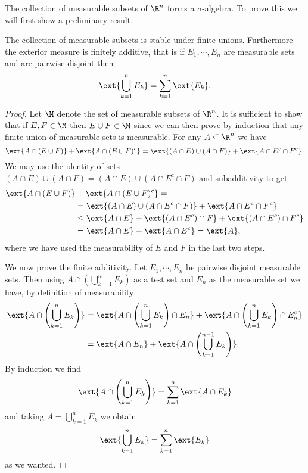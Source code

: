 \documentclass[12pt,oneside]{book}
\begin{document}
The collection of measurable subsets of \( \R^n \) forms a \( \sigma \)-algebra. To prove this we will first show a preliminary result. 
\begin{proposition}
	The collection of measurable subsets is stable under finite unions. Furthermore the exterior measure is finitely additive, that is if \( E_1, \cdots, E_n \) are measurable sets and are pairwise disjoint then 
	\begin{equation*}
		\ext{\bigcup_{k = 1}^n E_k} = \sum_{k = 1}^{n} \ext{E_k}. 
	\end{equation*}
\end{proposition}
\begin{proof}
	Let \( \M \) denote the set of measurable subsets of \( \R^n \). It is sufficient to show that if \( E, F \in \M \) then \(  E \cup F \in \M \) since we can then prove by induction that any finite union of measurable sets is measurable. For any \( A \subseteq \R^n \) we have
	\begin{equation*}
		\ext{A \cap (E \cup F)} + \ext{A \cap (E \cup F)^c} = \ext{(A \cap E) \cup (A \cap F)} + \ext{A \cap E^c \cap F^c}.
	\end{equation*}
	We may use the identity of sets \( (A \cap E) \cup (A \cap F) = (A \cap E) \cup (A \cap E^c \cap F) \) and subadditivity to get
	\begin{align*}
		\ext{A \cap (E \cup F)} & + \ext{A \cap (E \cup F)^c} = \\
														& = \ext{(A \cap E) \cup (A \cap E^c \cap F)} + \ext{A \cap E^c \cap F^c} \\
														& \leq \ext{A \cap E} + \ext{(A \cap E^c) \cap F} + \ext{(A \cap E^c) \cap F^c} \\
														& = \ext{A \cap E} + \ext{A \cap E^c} = \ext{A},
	\end{align*}
	where we have used the measurability of \( E \) and \( F \) in the last two steps. 

	We now prove the finite additivity. Let \( E_1, \cdots, E_n \) be pairwise disjoint measurable sets. Then using \( A \cap \left(\bigcup_{k = 1}^n	E_k\right) \) as a test set and \( E_n \) as the measurable set we have, by definition of measurability
	\begin{align*}
		\ext{A \cap \left(\bigcup_{k = 1}^n	E_k\right)} & = \ext{A \cap \left(\bigcup_{k = 1}^n	E_k\right) \cap E_n} + \ext{A \cap \left(\bigcup_{k = 1}^n	E_k\right) \cap E_n^c} \\
																										& = \ext{A \cap E_n} + \ext{A \cap \left(\bigcup_{k = 1}^{n-1}	E_k\right)}.
	\end{align*}
	By induction we find
	\begin{equation*}
		\ext{A \cap \left(\bigcup_{k = 1}^n	E_k\right)} = \sum_{k = 1}^{n} \ext{A \cap E_k} 
	\end{equation*}
	and taking \( A = \bigcup_{k = 1}^n E_k \) we obtain
	\begin{equation*}
		\ext{\bigcup_{k = 1}^n E_k} = \sum_{k = 1}^{n}\ext{E_k} 
	\end{equation*}
	as we wanted.
\end{proof}
\end{document}
